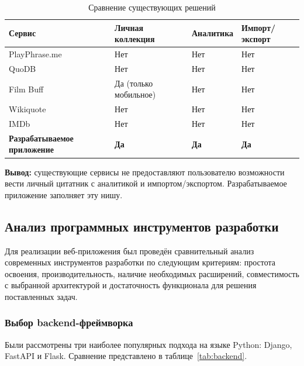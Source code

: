 \begin{table}[ht!]
    \centering
    \caption{Сравнение существующих решений}
    \label{tab:analogs}
    \begin{tabular}{|p{}|p{}|p{}|p{}|}
        \hline
        \textbf{Сервис} 					& \textbf{Личная коллекция} & \textbf{Аналитика} & \textbf{Импорт/экспорт} \\ \hline
        PlayPhrase.me 						& Нет 						& Нет 				 & Нет 					   \\ \hline
        QuoDB 								& Нет 						& Нет 				 & Нет 					   \\ \hline
        Film Buff 							& Да (только мобильное) 	& Нет 				 & Нет 					   \\ \hline
        Wikiquote 							& Нет 						& Нет 				 & Нет 					   \\ \hline
        IMDb 								& Нет 						& Нет 				 & Нет 					   \\ \hline
        \textbf{Разрабатываемое приложение} & \textbf{Да} 				& \textbf{Да} 		 & \textbf{Да} 			   \\ \hline
    \end{tabular}
\end{table}

\textbf{Вывод:} существующие сервисы не предоставляют пользователю возможности вести личный 
цитатник с аналитикой и импортом/экспортом. Разрабатываемое приложение заполняет эту нишу.

\subsection{Анализ программных инструментов разработки}

Для реализации веб-приложения был проведён сравнительный анализ современных инструментов 
разработки по следующим критериям: простота освоения, производительность, наличие необходимых 
расширений, совместимость с выбранной архитектурой и достаточность функционала для решения 
поставленных задач.

\subsubsection{Выбор backend-фреймворка}

Были рассмотрены три наиболее популярных подхода на языке Python: Django, FastAPI и Flask. 
Сравнение представлено в таблице~\ref{tab:backend}.

